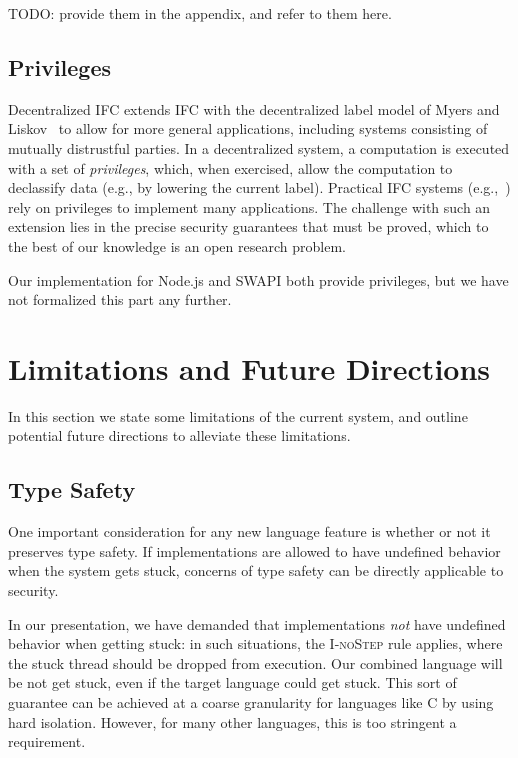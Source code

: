 TODO: provide them in the appendix, and refer to them here.


\subsection{Privileges}
Decentralized IFC extends IFC with the decentralized label model of
Myers and Liskov~\cite{myers:dlm} to allow for more general
applications, including systems consisting of mutually distrustful
parties.  In a decentralized system, a computation is executed with a
set of \emph{privileges}, which, when exercised, allow the computation
to declassify data (e.g., by lowering the current label).
%
Practical IFC systems
(e.g.,~\cite{Zeldovich:2006, lio,
  Hritcu:2013:YIB:2497621.2498098, myers:jif}) rely on privileges to
implement many applications.
%
%
The challenge with such an extension lies in the precise
security guarantees that must be proved, which to the best of our
knowledge is an open research problem.

Our implementation for Node.js and SWAPI both provide privileges, but
we have not formalized this part any further.
%


\section{Limitations and Future Directions}

In this section we state some limitations of the current system, and
outline potential future directions to alleviate these limitations.

\subsection{Type Safety}
\label{sec:extensions:types}

One important consideration for any new language feature is whether
or not it preserves type safety.  If implementations are allowed to
have undefined behavior when the system gets stuck, concerns of type
safety can be directly applicable to security.

In our presentation, we have demanded that implementations \emph{not}
have undefined behavior when getting stuck: in such situations, the
\textsc{I-noStep} rule applies, where the stuck thread should be dropped
from execution.  Our combined language will be not get stuck, even if
the target language could get stuck.  This sort of guarantee can be
achieved at a coarse granularity for languages like C by using hard
isolation.  However, for many other languages, this is too stringent a
requirement.


